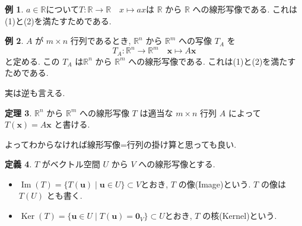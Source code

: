 \documentclass[dvipdfmx,a4paper,11pt]{article} %
\newcommand{\R}{\mathbb{R}}
\theoremstyle{definition}
\newtheorem{thm}{定理}[section]
\newtheorem{defn}[thm]{定義}
\newtheorem{eg}[thm]{例}
\begin{document}
\begin{eg}
$a \in \R$について\(T : \R \to \R \quad x \mapsto ax\)は \(\mathbb{R}\) から \(\mathbb{R}\) への線形写像である.
これは(1)と(2)を満たすためである. 
\end{eg}

\begin{eg}%
\label{ex-linear-map-matrix}
\(A\) が \(m\times n\) 行列であるとき,
\(\mathbb{R}^n\) から \(\mathbb{R}^m\) への写像 \(T_A\) を
\[
T_A : \R^n \to \R^m
\quad 
\bm{x} \mapsto A\bm{x}
\]
と定める. この \(T_A\) は\(\mathbb{R}^n\) から \(\mathbb{R}^m\) への線形写像である.
これは(1)と(2)を満たすためである. 
\end{eg}

実は逆も言える.
\begin{thm}
  \(\mathbb{R}^n\) から \(\mathbb{R}^m\) への線形写像 \(T\) は適当な \(m\times n\) 行列 \(A\) によって
\(
T(\bm{x})=A\bm{x}
\)
と書ける.
\end{thm}
よってわからなければ線形写像=行列の掛け算と思っても良い.



\begin{defn}%
\(T\) がベクトル空間 \(U\) から \(V\) への線形写像とする. 
\begin{itemize}
\item \(\operatorname{Im}(T)=\{T(\bm{u}) \mid \bm{u}\in U\} \subset V\)とおき, \(T\) の像(Image)という. \(T\) の像は \(T(U)\) とも書く.
\item \(\operatorname{Ker}(T)=\{\bm{u}\in U\mid T(\bm{u})=\bm{0}_V\} \subset U\)とおき, \(T\) の核(Kernel)という.
\end{itemize}
\end{defn}
\end{document}
